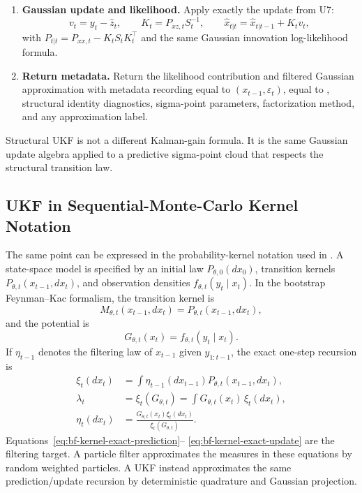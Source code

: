 \begin{enumerate}[label=\textbf{S\arabic*.}]
\begin{align}
      S_t &=
        \sum_j w_j^{(c)}(z_t^{(j)}-\hat z_t)(z_t^{(j)}-\hat z_t)^\top + R_t,\\
      P_{xz,t} &=
        \sum_j w_j^{(c)}
        (x_t^{(j)}-\hat x_{t|t-1})(z_t^{(j)}-\hat z_t)^\top .
    \end{align}
  \item \textbf{Gaussian update and likelihood.}  Apply exactly the update from
    U7:
    \[
      v_t=y_t-\hat z_t,\qquad
      K_t=P_{xz,t}S_t^{-1},\qquad
      \hat x_{t|t}=\hat x_{t|t-1}+K_tv_t,
    \]
    with $P_{t|t}=P_{xx,t}-K_tS_tK_t^\top$ and the same Gaussian innovation
    log-likelihood formula.
  \item \textbf{Return metadata.}  Return the likelihood contribution and
    filtered Gaussian approximation with metadata recording
     equal to $(x_{t-1},\varepsilon_t)$,
     equal to , structural
    identity diagnostics, sigma-point parameters, factorization method, and any
    approximation label.
\end{enumerate}
Structural UKF is not a different Kalman-gain formula.  It is the same Gaussian
update algebra applied to a predictive sigma-point cloud that respects the
structural transition law.

\subsection{UKF in Sequential-Monte-Carlo Kernel Notation}
\label{sec:bf-ukf-kernel-notation}

The same point can be expressed in the probability-kernel notation used in
\citet{chopin2020introduction}.  A state-space model is specified by an initial
law $P_{\theta,0}(dx_0)$, transition kernels
$P_{\theta,t}(x_{t-1},dx_t)$, and observation densities
$f_{\theta,t}(y_t\mid x_t)$.  In the bootstrap Feynman--Kac formalism, the
transition kernel is
\[
  M_{\theta,t}(x_{t-1},dx_t)=P_{\theta,t}(x_{t-1},dx_t),
\]
and the potential is
\begin{equation}
  G_{\theta,t}(x_t)=f_{\theta,t}(y_t\mid x_t).
\end{equation}
If $\eta_{t-1}$ denotes the filtering law of $x_{t-1}$ given
$y_{1:t-1}$, the exact one-step recursion is
\begin{align}
  \xi_t(dx_t)
    &=
    \int \eta_{t-1}(dx_{t-1})
      P_{\theta,t}(x_{t-1},dx_t),
    \label{eq:bf-kernel-exact-prediction}\\
  \lambda_t
    &=
    \xi_t(G_{\theta,t})
    =
    \int G_{\theta,t}(x_t)\,\xi_t(dx_t),
    \label{eq:bf-kernel-exact-likelihood-factor}\\
  \eta_t(dx_t)
    &=
    \frac{G_{\theta,t}(x_t)\xi_t(dx_t)}{\xi_t(G_{\theta,t})}.
    \label{eq:bf-kernel-exact-update}
\end{align}
Equations~\eqref{eq:bf-kernel-exact-prediction}--%
\eqref{eq:bf-kernel-exact-update} are the filtering target.  A particle filter
approximates the measures in these equations by random weighted particles.  A
UKF instead approximates the same prediction/update recursion by deterministic
quadrature and Gaussian projection.

